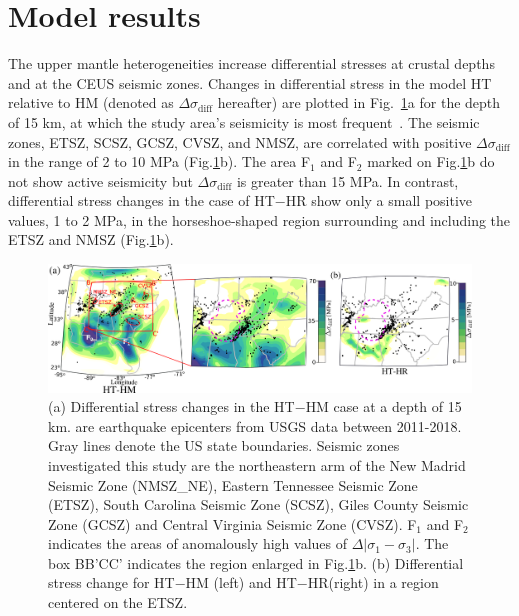 \documentclass[draft,linenumbers]{agujournal2018}
\begin{document}
\section{Model results}
%
The upper mantle heterogeneities increase differential stresses at crustal depths and at the CEUS seismic zones. Changes in differential stress in the model HT relative to HM (denoted as $\Delta \sigma_{\text{diff}}$ hereafter)
are plotted in Fig.~\ref{df_model}a for the depth of 15 km, at which the study area's seismicity is most frequent~\citep[e.g.,][]{mazzotti2010state}. The seismic zones, ETSZ, SCSZ, GCSZ, CVSZ, and NMSZ, are correlated with positive $\Delta \sigma_{\text{diff}}$ in the range of 2 to 10 MPa (Fig.\ref{df_model}b). The area F$_{1}$ and F$_{2}$ marked on Fig.\ref{df_model}b do not show active seismicity but $\Delta \sigma_{\text{diff}}$ is greater than 15 MPa. In contrast, differential stress changes in the case of HT$-$HR show only a small positive values, 1 to 2 MPa, in the horseshoe-shaped region surrounding  and including the ETSZ and NMSZ (Fig.\ref{df_model}b).
%
\begin{figure}[h!]
    \centering
    \includegraphics[width=0.75\linewidth]{figures/diff_stress_model.png}
    \caption{(a) Differential stress changes in the HT$-$HM case at a depth of 15 km.  are earthquake epicenters from USGS data between 2011-2018. Gray lines denote the US state boundaries. Seismic zones investigated this study are the northeastern arm of the New Madrid Seismic Zone (NMSZ\_NE), Eastern Tennessee Seismic Zone (ETSZ), South Carolina Seismic Zone (SCSZ), Giles County Seismic Zone (GCSZ) and Central Virginia Seismic Zone (CVSZ). F$_1$ and F$_2$ indicates the areas of anomalously high values of $\Delta|\sigma_1 - \sigma_3|$. The box BB'CC' indicates the region enlarged in Fig.\ref{df_model}b. (b) Differential stress change for HT$-$HM (left) and HT$-$HR(right) in a region centered on the ETSZ.}
    \label{df_model}
\end{figure}
\end{document}
